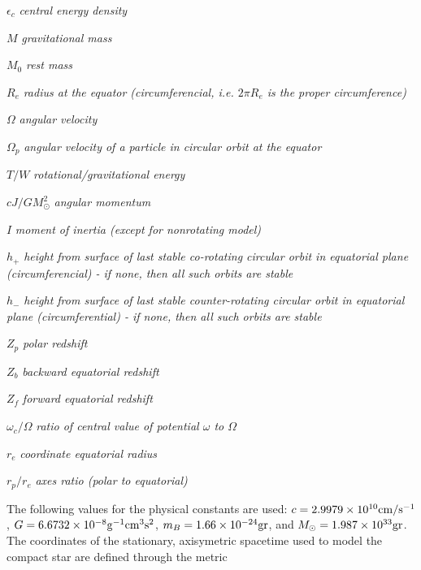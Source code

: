 \begin{description}

\item{ $\epsilon_c$ {\it central energy density}}
\item{ $M$ {\it gravitational mass}}
\item{ $M_0$ {\it rest mass}}
\item{ $R_e$ {\it radius at the equator (circumferencial, i.e. $2 \pi R_e$ is 
the proper circumference) }}
\item{ $\Omega$ {\it angular velocity}}
\item{ $\Omega_p$ {\it angular velocity of a particle in circular orbit 
                      at the equator}}
\item{ $T/W$ {\it rotational/gravitational energy}}
\item{ $cJ/GM_{\odot}^2$ {\it angular momentum}}
\item{ $I$ {\it moment of inertia (except for nonrotating model)}}
\item{ $h_+$ {\it height from surface of last stable co-rotating circular 
               orbit in equatorial plane (circumferencial) - if none, then all 
              such orbits are stable}}
\item{ $h_-$ {\it height from surface of last stable counter-rotating circular 
               orbit in equatorial plane (circumferential) - if none, then all 
               such orbits are stable}}
\item{ $Z_p$ {\it polar redshift}}
\item{ $Z_b$ {\it backward equatorial redshift}}
\item{ $Z_f$ {\it forward equatorial redshift}}
\item{ $\omega_c/ \Omega$ {\it ratio of central value of potential $\omega$ to 
                             $\Omega$}}
\item{ $r_e$ {\it coordinate equatorial radius }}
\item{ $r_p/r_e$ {\it axes ratio (polar to equatorial)}}

\end{description} 

\<The following values for the physical constants are used: $c=2.9979 \times
10^{10} {\rm cm/s^{-1}}$, $G=6.6732 \times 10^{-8} {\rm g^{-1} cm^3 s^2}$, 
$m_B=1.66 \times 10^{-24} {\rm gr}$, and $M_{\odot}=1.987 \times 10^{33}
{\rm gr}$.
The coordinates of the stationary, axisymetric spacetime used to model the 
compact star are defined through the metric

